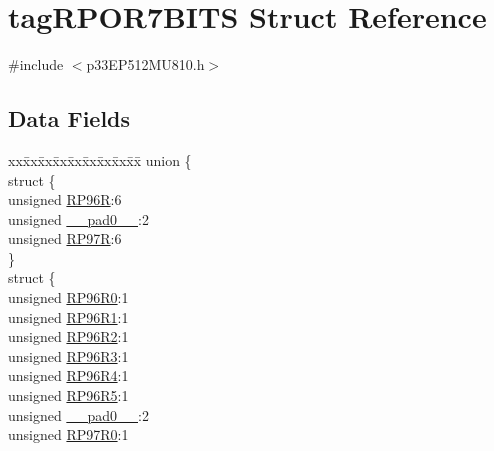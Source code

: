 \hypertarget{structtag_r_p_o_r7_b_i_t_s}{}\section{tag\+R\+P\+O\+R7\+B\+I\+TS Struct Reference}
\label{structtag_r_p_o_r7_b_i_t_s}


{\ttfamily \#include $<$p33\+E\+P512\+M\+U810.\+h$>$}

\subsection*{Data Fields}
\begin{DoxyCompactItemize}
\item 
\begin{tabbing}
xx\=xx\=xx\=xx\=xx\=xx\=xx\=xx\=xx\=\kill
union \{\\
\>struct \{\\
\>\>unsigned \hyperlink{structtag_r_p_o_r7_b_i_t_s_a9f7f2e23d35a38b7d47f4608e8176282}{RP96R}:6\\
\>\>unsigned \hyperlink{structtag_r_p_o_r7_b_i_t_s_adf71f3d8410c1f1dbbc96680a92c49af}{\_\_pad0\_\_}:2\\
\>\>unsigned \hyperlink{structtag_r_p_o_r7_b_i_t_s_aba702dd57834604b848420beaf150caa}{RP97R}:6\\
\>\} \\
\>struct \{\\
\>\>unsigned \hyperlink{structtag_r_p_o_r7_b_i_t_s_a3e1f1aa1a8e6eb1b9b99824247288f96}{RP96R0}:1\\
\>\>unsigned \hyperlink{structtag_r_p_o_r7_b_i_t_s_a785983d835817856eb954ec8ea96b414}{RP96R1}:1\\
\>\>unsigned \hyperlink{structtag_r_p_o_r7_b_i_t_s_a8288f4275feaf2a7807f83da0eee82e1}{RP96R2}:1\\
\>\>unsigned \hyperlink{structtag_r_p_o_r7_b_i_t_s_a3eaaf5abff503ba3864f6d92bfa3433f}{RP96R3}:1\\
\>\>unsigned \hyperlink{structtag_r_p_o_r7_b_i_t_s_a58a8dbf16eac9521872bb73b313854ef}{RP96R4}:1\\
\>\>unsigned \hyperlink{structtag_r_p_o_r7_b_i_t_s_a76bfa1c2932177e0e800396fe47b9b5e}{RP96R5}:1\\
\>\>unsigned \hyperlink{structtag_r_p_o_r7_b_i_t_s_adf71f3d8410c1f1dbbc96680a92c49af}{\_\_pad0\_\_}:2\\
\>\>unsigned \hyperlink{structtag_r_p_o_r7_b_i_t_s_a1f9e3a0f8e06392c14a37c2118b65044}{RP97R0}:1\\

\end{tabbing}
\end{DoxyCompactItemize}
